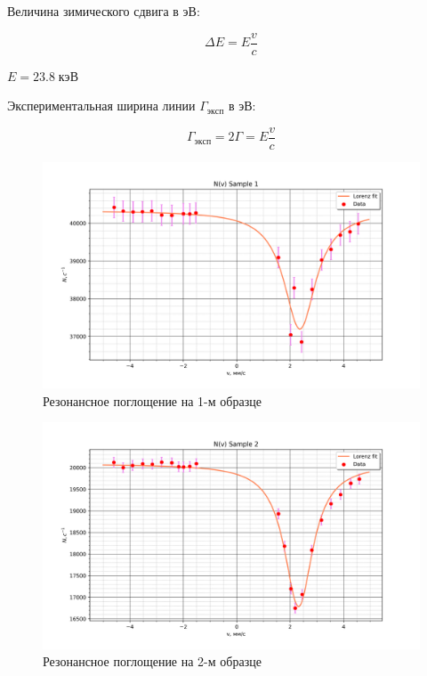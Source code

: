 \documentclass[a4paper]{article}
\begin{document}
\begin{enumerate}
    Величина зимического сдвига в эВ:

    \begin{equation}
        \Delta E = E \frac{v}{c}
    \end{equation}

    $E = 23.8\; кэВ$ \par 

    Экспериментальная ширина линии $\Gamma_{эксп}$ в эВ:

    \begin{equation}
        \Gamma_{эксп} = 2\Gamma = E \frac{v}{c}
    \end{equation}



\end{enumerate}

\begin{figure}[H]
    \begin{center}
        \includegraphics[scale = 0.5]{S1fit.png}
        \caption{Резонансное поглощение на 1-м образце}
        \label{S1fit}
    \end{center}
\end{figure}

\begin{figure}[H]
    \begin{center}
        \includegraphics[scale = 0.5]{S2fit.png}
        \caption{Резонансное поглощение на 2-м образце}
        \label{S2fit}
    \end{center}
\end{figure}
\end{document}
